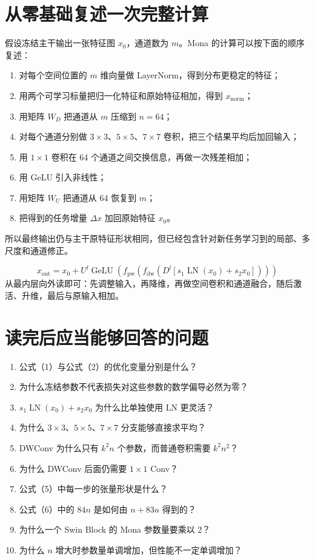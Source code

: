 \documentclass[UTF8,12pt,a4paper,fontset=none]{ctexart}
\newcommand{\LN}{\operatorname{LN}}
\newcommand{\GeLU}{\operatorname{GeLU}}
\begin{document}
\section{从零基础复述一次完整计算}

假设冻结主干输出一张特征图 $x_0$，通道数为 $m$。Mona 的计算可以按下面的顺序复述：
\begin{enumerate}
  \item 对每个空间位置的 $m$ 维向量做 LayerNorm，得到分布更稳定的特征；
  \item 用两个可学习标量把归一化特征和原始特征相加，得到 $x_{\mathrm{norm}}$；
  \item 用矩阵 $W_D$ 把通道从 $m$ 压缩到 $n=64$；
  \item 对每个通道分别做 $3\times3$、$5\times5$、$7\times7$ 卷积，把三个结果平均后加回输入；
  \item 用 $1\times1$ 卷积在 64 个通道之间交换信息，再做一次残差相加；
  \item 用 GeLU 引入非线性；
  \item 用矩阵 $W_U$ 把通道从 64 恢复到 $m$；
  \item 把得到的任务增量 $\Delta x$ 加回原始特征 $x_0$。
\end{enumerate}

所以最终输出仍与主干原特征形状相同，但已经包含针对新任务学习到的局部、多尺度和通道修正。

\begin{keybox}
\begin{equation*}
\boxed{
 x_{\mathrm{out}}
 =x_0+U^l\GeLU\!\left(
 f_{\mathrm{pw}}\!\left(
 f_{\mathrm{dw}}\!\left(
 D^l\!\left[s_1\LN(x_0)+s_2x_0\right]
 \right)\right)\right)
}
\end{equation*}
从最内层向外读即可：先调整输入，再降维，再做空间卷积和通道融合，随后激活、升维，最后与原输入相加。
\end{keybox}

\section{读完后应当能够回答的问题}

\begin{enumerate}
  \item 公式（1）与公式（2）的优化变量分别是什么？
  \item 为什么冻结参数不代表损失对这些参数的数学偏导必然为零？
  \item $s_1\LN(x_0)+s_2x_0$ 为什么比单独使用 LN 更灵活？
  \item 为什么 $3\times3$、$5\times5$、$7\times7$ 分支能够直接求平均？
  \item DWConv 为什么只有 $k^2n$ 个参数，而普通卷积需要 $k^2n^2$？
  \item 为什么 DWConv 后面仍需要 $1\times1$ Conv？
  \item 公式（5）中每一步的张量形状是什么？
  \item 公式（6）中的 $84n$ 是如何由 $n+83n$ 得到的？
  \item 为什么一个 Swin Block 的 Mona 参数量要乘以 2？
  \item 为什么 $n$ 增大时参数量单调增加，但性能不一定单调增加？
\end{enumerate}
\end{document}
